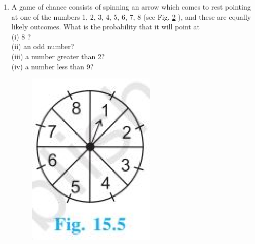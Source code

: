 \begin{enumerate}[label=\arabic*.,ref=\thesubsection.\theenumi]
\begin{figure}[!ht]
\caption{}
\label{fig:prob_121}
\end{figure}
\\
\solution


\item A game of chance consists of spinning an arrow which comes to rest pointing at one of the numbers 1, 2, 3, 4, 5, 6, 7, 8 (see Fig. \ref{fig:122} ), and these are equally likely outcomes. What is the probability that it will point at\\
(i) 8 ?\\
(ii) an odd number?\\
(iii) a number greater than 2?\\
(iv) a number less than 9?\\
\begin{figure}[!ht]
\centering
\includegraphics[width=\columnwidth]{./prob/figs/clock.eps}
\caption{}
\label{fig:122}

\end{figure}
\end{enumerate}
